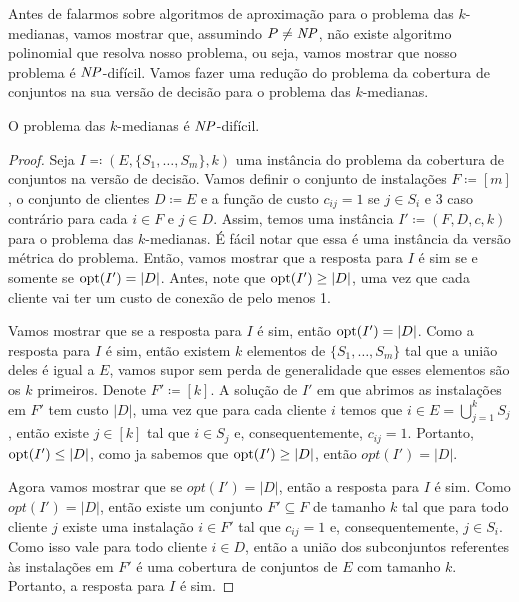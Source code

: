 Antes de falarmos sobre algoritmos de aproximação para o problema das $k$-medianas, vamos mostrar que, assumindo $P \neq \mathit{NP}$, não existe algoritmo polinomial que resolva nosso problema, ou seja, vamos mostrar que nosso problema é $\mathit{NP}$-difícil. Vamos fazer uma redução do problema da cobertura de conjuntos na sua versão de decisão para o problema das $k$-medianas.

\begin{theorem}
O problema das $k$-medianas é $\mathit{NP}$-difícil.
\end{theorem}
\begin{proof}
Seja $I \eqqcolon (E,\{S_1,\ldots,S_m\},k)$ uma instância do problema da cobertura de conjuntos na versão de decisão. Vamos definir o conjunto de instalações $F \coloneqq [m]$, o conjunto de clientes $D \coloneqq E$ e a função de custo $c_{ij} = 1$ se $j \in S_i$ e 3 caso contrário para cada $i \in F$ e $j \in D$. Assim, temos uma instância $I' \coloneqq (F,D,c,k)$ para o problema das $k$-medianas. É fácil notar que essa é uma instância da versão métrica do problema. Então, vamos mostrar que a resposta para $I$ é sim se e somente se $\mathrm{opt}(I') = |D|$. Antes, note que $\mathrm{opt}(I') \geq |D|$, uma vez que cada cliente vai ter um custo de conexão de pelo menos 1.

Vamos mostrar que se a resposta para $I$ é sim, então $\mathrm{opt}(I') = |D|$. Como a resposta para $I$ é sim, então existem $k$ elementos de $\{S_1,\ldots,S_m\}$ tal que a união deles é igual a $E$, vamos supor sem perda de generalidade que esses elementos são os $k$ primeiros. Denote $F' \coloneqq [k]$. A solução de $I'$ em que abrimos as instalações em $F'$ tem custo $|D|$, uma vez que para cada cliente $i$ temos que $i \in E = \bigcup_{j= 1}^k S_j$, então existe $j \in [k]$ tal que $i \in S_j$ e, consequentemente, $c_{ij} = 1$. Portanto, $\mathrm{opt}(I') \leq |D|$, como ja sabemos que $\mathrm{opt}(I') \geq |D|$, então $opt(I') = |D|$.

Agora vamos mostrar que se $opt(I') = |D|$, então a resposta para $I$ é sim. Como $opt(I') = |D|$, então existe um conjunto $F' \subseteq F$ de tamanho $k$ tal que para todo cliente $j$ existe uma instalação $i \in F'$ tal que $c_{ij} = 1$ e, consequentemente, $j \in S_i$. Como isso vale para todo cliente $i \in D$, então a união dos subconjuntos referentes às instalações em $F'$ é uma cobertura de conjuntos de $E$ com tamanho $k$. Portanto, a resposta para $I$ é sim.
\end{proof}